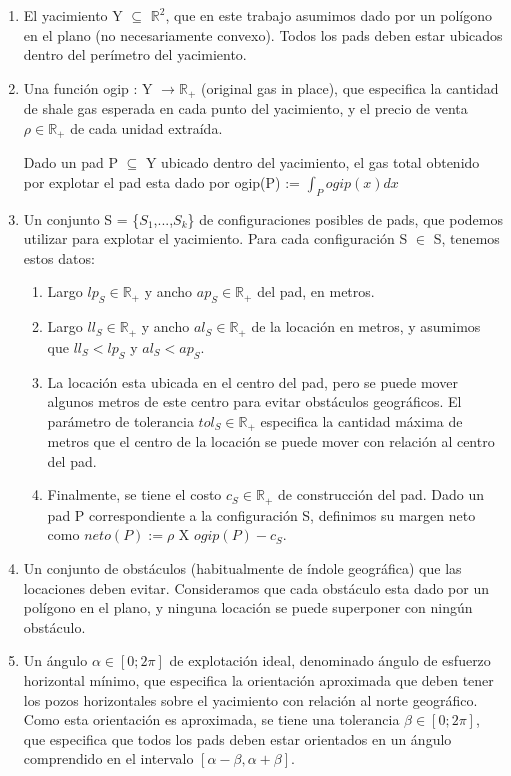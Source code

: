\begin{enumerate}
\item El yacimiento Y  $\subseteq$ $\mathbb{R}^2$, que en este trabajo asumimos dado por un pol\'igono en el plano (no necesariamente convexo). Todos los pads deben estar ubicados dentro del per\'imetro del yacimiento.
\item Una funci\'on ogip : Y $\rightarrow \mathbb{R}_{+}$ (original gas in place), que especifica la
cantidad de shale gas esperada en cada punto del yacimiento, y el precio
de venta $\rho  \in \mathbb{R}_{+}$ de cada unidad extra\'ida. 

Dado un pad P $\subseteq$ Y ubicado
dentro del yacimiento, el gas total obtenido por explotar el pad esta dado
por ogip(P) := $\int_{P}^{} ogip(x) dx$
\item Un conjunto S = \{$S_1$,...,$S_k$\} de configuraciones posibles de pads, que
podemos utilizar para explotar el yacimiento. Para cada configuraci\'on S $\in$ S, tenemos estos datos:
\begin{enumerate}
\item  Largo $lp_S \in \mathbb{R}_{+}$ y ancho $ap_S \in \mathbb{R}_{+}$ del pad, en metros.
\item  Largo $ll_S \in \mathbb{R}_{+}$ y ancho $al_S \in \mathbb{R}_{+}$ de la locaci\'on en metros, y asumimos que $ll_S < lp_S$ y $al_S < ap_S$.
\item  La locaci\'on esta ubicada en el centro del pad, pero se puede mover algunos metros de este centro para evitar obst\'aculos geogr\'aficos. El par\'ametro de tolerancia $tol_S \in \mathbb{R}_{+}$ especifica la cantidad m\'axima de metros que el centro de la locaci\'on se puede mover con relaci\'on
al centro del pad.
\item  Finalmente, se tiene el costo $c_S \in \mathbb{R}_{+}$ de construcci\'on del pad.
Dado un pad P correspondiente a la configuraci\'on S, definimos su margen neto como $neto(P) := \rho$ X $ogip(P) - c_S$.
\end{enumerate}
\item  Un conjunto de obst\'aculos (habitualmente de \'indole geogr\'afica) que las locaciones deben evitar. Consideramos que cada obst\'aculo esta dado por un pol\'igono en el plano, y ninguna locaci\'on se puede superponer con ning\'un obst\'aculo.
\item Un \'angulo $\alpha \in [0; 2\pi]$ de explotaci\'on ideal, denominado \'angulo de esfuerzo horizontal m\'inimo, que especifica la orientaci\'on aproximada que deben tener los pozos horizontales sobre el yacimiento con relaci\'on al norte geogr\'afico. Como esta orientaci\'on es aproximada, se tiene una tolerancia $\beta \in [0; 2\pi]$, que especifica que todos los pads deben estar orientados en un \'angulo comprendido en el intervalo $[\alpha - \beta, \alpha + \beta]$.
\end{enumerate}




